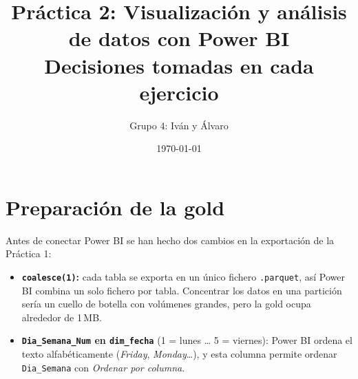 \documentclass[11pt,a4paper]{article}
\title{Práctica 2: Visualización y análisis de datos con Power BI\\
\large Decisiones tomadas en cada ejercicio}
\author{Grupo 4: Iván y Álvaro}
\date{\today}
\newcommand{\code}[1]{\texttt{#1}}
\begin{document}
\maketitle

\section*{Preparación de la gold}
Antes de conectar Power BI se han hecho dos cambios en la exportación de la Práctica 1:
\begin{itemize}
    \item \textbf{\code{coalesce(1)}:} cada tabla se exporta en un único fichero \code{.parquet}, así Power BI combina un solo fichero por tabla. Concentrar los datos en una partición sería un cuello de botella con volúmenes grandes, pero la gold ocupa alrededor de 1\,MB.
    \item \textbf{\code{Dia\_Semana\_Num} en \code{dim\_fecha}} (1 = lunes \ldots{} 5 = viernes): Power BI ordena el texto alfabéticamente (\textit{Friday}, \textit{Monday}\ldots), y esta columna permite ordenar \code{Dia\_Semana} con \textit{Ordenar por columna}.
\end{itemize}
\end{document}
